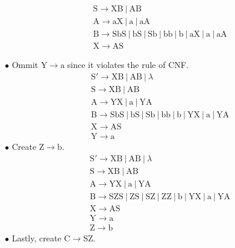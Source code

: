 \documentclass{report}
\begin{document}
{\begin{minipage}[t]{0.48\textwidth}
\begin{equation*}
\begin{aligned}
            &\mathrm{S} \longrightarrow \mathrm{XB~|~AB}\\
            &\mathrm{A} \longrightarrow \mathrm{aX~|~a~|~aA}\\
            &\mathrm{B} \longrightarrow \mathrm{SbS~|~bS~|~Sb~|~bb~|~b~|~aX~|~a~|~aA}\\
            &\mathrm{X} \longrightarrow \mathrm{AS}
        \end{aligned}
    \end{equation*}
\end{minipage}
\hfill
\begin{minipage}[t]{0.48\textwidth}
    $\bullet$ Ommit $\mathrm{Y} \longrightarrow \mathrm{a}$ since it violates the rule of CNF.
    \begin{equation*}
        \begin{aligned}
            &\mathrm{S'} \longrightarrow \mathrm{XB~|~AB~|~}\lambda\\
            &\mathrm{S} \longrightarrow \mathrm{XB~|~AB}\\
            &\mathrm{A} \longrightarrow \mathrm{YX~|~a~|~YA}\\
            &\mathrm{B} \longrightarrow \mathrm{SbS~|~bS~|~Sb~|~bb~|~b~|~YX~|~a~|~YA}\\
            &\mathrm{X} \longrightarrow \mathrm{AS}\\
            &\mathrm{Y} \longrightarrow \mathrm{a}
        \end{aligned}
    \end{equation*}
    $\bullet$ Create $\mathrm{Z} \longrightarrow \mathrm{b}$.
    \begin{equation*}
        \begin{aligned}
            &\mathrm{S'} \longrightarrow \mathrm{XB~|~AB~|~}\lambda\\
            &\mathrm{S} \longrightarrow \mathrm{XB~|~AB}\\
            &\mathrm{A} \longrightarrow \mathrm{YX~|~a~|~YA}\\
            &\mathrm{B} \longrightarrow \mathrm{SZS~|~ZS~|~SZ~|~ZZ~|~b~|~YX~|~a~|~YA}\\
            &\mathrm{X} \longrightarrow \mathrm{AS}\\
            &\mathrm{Y} \longrightarrow \mathrm{a}\\
            &\mathrm{Z} \longrightarrow \mathrm{b}
        \end{aligned}
    \end{equation*}
    $\bullet$ Lastly, create $\mathrm{C} \longrightarrow \mathrm{SZ}$.

\end{minipage}}
\end{document}
